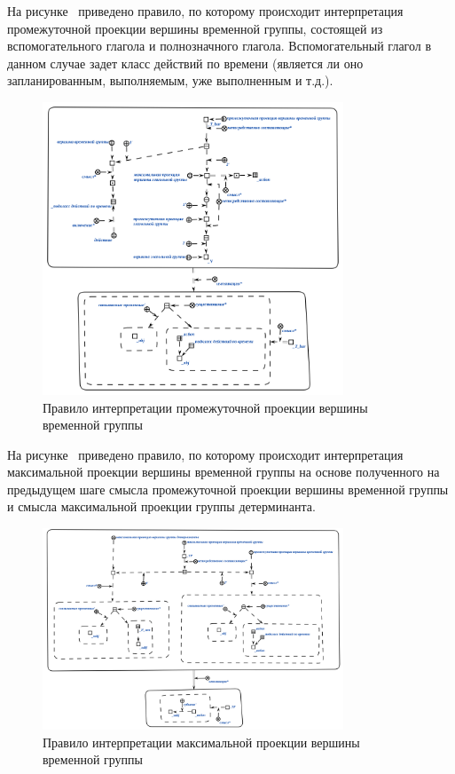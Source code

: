 На рисунке~\textit{} приведено правило, по которому происходит интерпретация промежуточной проекции вершины временной группы, состоящей из вспомогательного глагола и полнозначного глагола. Вспомогательный глагол в данном случае задет класс действий по времени (является ли оно запланированным, выполняемым, уже выполненным и т.д.).

\begin{figure}[h]
    \centering
    \includegraphics[width=0.8\textwidth]{images/part2/chapter_lang/d_sem_5.png}
    \caption{Правило интерпретации промежуточной проекции вершины временной группы}
    \label{fig:d_sem_5}
\end{figure}

На рисунке~\textit{} приведено правило, по которому происходит интерпретация максимальной проекции вершины временной группы на основе полученного на предыдущем шаге смысла промежуточной проекции вершины временной группы и смысла максимальной проекции группы детерминанта.

\begin{figure}[h]
    \centering
    \includegraphics[width=0.8\textwidth]{images/part2/chapter_lang/d_sem_6.png}
    \caption{Правило интерпретации максимальной проекции вершины временной группы}
    \label{fig:d_sem_6}
\end{figure}

